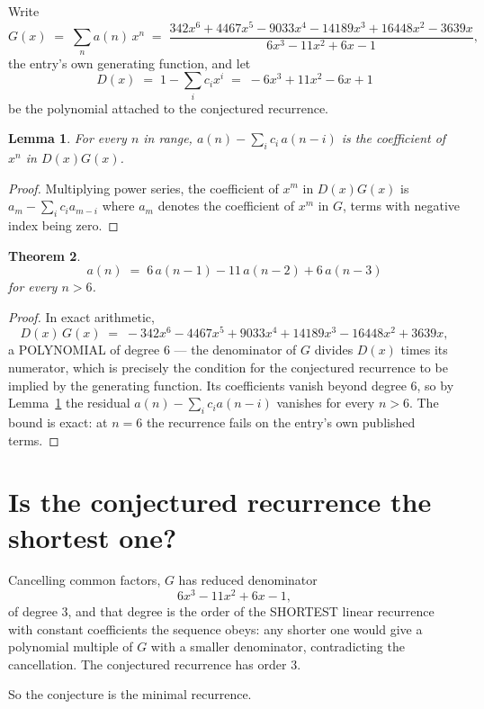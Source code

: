 \documentclass[11pt,a4paper]{article}
\theoremstyle{plain}
\newtheorem{theorem}{Theorem}
\newtheorem{lemma}[theorem]{Lemma}
\theoremstyle{definition}
\begin{document}
Write
\[
G(x)\;=\;\sum_{n}a(n)\,x^{n}\;=\;\frac{342 x^{6} + 4467 x^{5} - 9033 x^{4} - 14189 x^{3} + 16448 x^{2} - 3639 x}{6 x^{3} - 11 x^{2} + 6 x - 1},
\]
the entry's own generating function, and let
\[
D(x)\;=\;1-\sum_i c_i x^{i}\;=\;- 6 x^{3} + 11 x^{2} - 6 x + 1
\]
be the polynomial attached to the conjectured recurrence.

\begin{lemma}\label{lem:key}
For every $n$ in range, $a(n)-\sum_i c_i\,a(n-i)$ is the coefficient of $x^{n}$ in
$D(x)G(x)$.
\end{lemma}

\begin{proof}
Multiplying power series, the coefficient of $x^{m}$ in $D(x)G(x)$ is
$a_m-\sum_i c_i a_{m-i}$ where $a_m$ denotes the coefficient of $x^{m}$ in $G$, terms with
negative index being zero.
\end{proof}

\begin{theorem}
\[
a(n)\;=\;6\,a(n-1) - 11\,a(n-2) + 6\,a(n-3)
\]
for every $n>6$.
\end{theorem}

\begin{proof}
In exact arithmetic,
\[
D(x)\,G(x)\;=\;- 342 x^{6} - 4467 x^{5} + 9033 x^{4} + 14189 x^{3} - 16448 x^{2} + 3639 x,
\]
a POLYNOMIAL of degree $6$ --- the denominator of $G$ divides $D(x)$ times its numerator,
which is precisely the condition for the conjectured recurrence to be implied by the
generating function. Its coefficients vanish beyond degree $6$, so by
Lemma~\ref{lem:key} the residual $a(n)-\sum_ic_ia(n-i)$ vanishes for every
$n>6$. The bound is exact: at $n=6$ the recurrence fails on the entry's own published terms.
\end{proof}

\section{Is the conjectured recurrence the shortest one?}

Cancelling common factors, $G$ has reduced denominator
\[
6 x^{3} - 11 x^{2} + 6 x - 1,
\]
of degree $3$, and that degree is the order of the SHORTEST linear recurrence with
constant coefficients the sequence obeys: any shorter one would give a polynomial multiple of
$G$ with a smaller denominator, contradicting the cancellation. The conjectured recurrence has
order $3$.

So the conjecture is the minimal recurrence.
\end{document}
